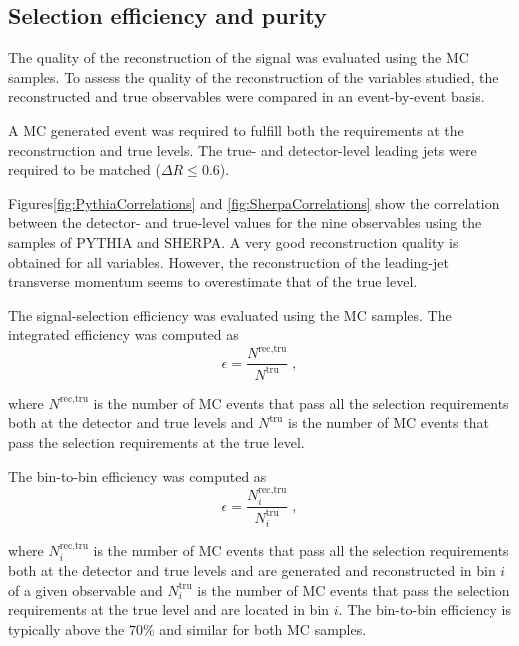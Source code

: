 \documentclass[12pt, twoside]{article}
\numberwithin{equation}{section}
\numberwithin{figure}{section}
\begin{document}
\newpage
\subsection{Selection efficiency and purity}
\label{subsec:MonteCarloSelectionEfficiency}

The quality of the reconstruction of the signal was evaluated using the MC samples. To assess the quality of the reconstruction of the variables studied, the reconstructed and true observables were compared in an event-by-event basis.

A MC generated event was required to fulfill both the requirements at the reconstruction and true levels. The true- and detector-level leading jets were required to be matched ($\Delta R \leq 0.6$).

Figures\;\ref{fig:PythiaCorrelations} and \ref{fig:SherpaCorrelations} show the correlation between the detector- and true-level values for the nine observables using the samples of PYTHIA and SHERPA. A very good reconstruction quality is obtained for all variables. However, the reconstruction of the leading-jet transverse momentum seems to overestimate that of the true level.

The signal-selection efficiency was evaluated using the MC samples. The integrated efficiency was computed as
\begin{equation}    \label{eq:MCEfficiency}
    \epsilon = \frac{N^{\text{rec,tru}}}{N^{\text{tru}}} \; ,
\end{equation}

where $N^{\text{rec,tru}}$ is the number of MC events that pass all the selection requirements both at the detector and true levels and $N^{\text{tru}}$ is the number of MC events that pass the selection requirements at the true level.

The bin-to-bin efficiency was computed as
\begin{equation}    \label{eq:MCEfficiencyBin}
    \epsilon = \frac{N^{\text{rec,tru}}_{i}}{N^{\text{tru}}_{i}} \; ,
\end{equation}

where $N^{\text{rec,tru}}_{i}$ is the number of MC events that pass all the selection requirements both at the detector and true levels and are generated and reconstructed in bin $i$ of a given observable and $N^{\text{tru}}_{i}$ is the number of MC events that pass the selection requirements at the true level and are located in bin $i$. The bin-to-bin efficiency is typically above the $70 \%$ and similar for both MC samples.
\end{document}
